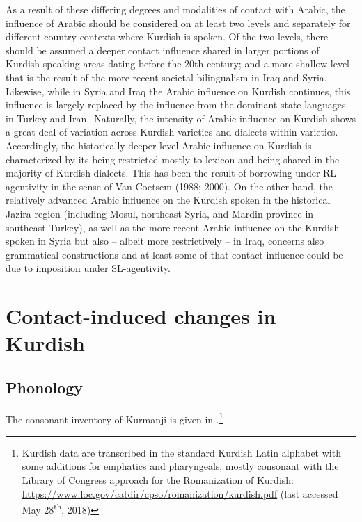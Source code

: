 \documentclass[output=paper]{langsci/langscibook}
\begin{document}
As a result of these differing degrees and modalities of contact with Arabic, the influence of Arabic should be considered on at least two levels and separately for different country contexts where Kurdish is spoken. Of the two levels, there should be assumed a deeper contact influence shared in larger portions of Kurdish-speaking areas dating before the 20th century; and a more shallow level that is the result of the more recent societal bilingualism in Iraq and Syria. Likewise, while in Syria and Iraq the Arabic influence on Kurdish continues, this influence is largely replaced by the influence from the dominant state languages in Turkey and Iran.~Naturally, the intensity of Arabic influence on Kurdish shows a great deal of variation across Kurdish varieties and dialects within varieties. Accordingly, the historically-deeper level Arabic influence on Kurdish is characterized by its being restricted mostly to lexicon and being shared in the majority of Kurdish dialects. This has been the result of borrowing under RL-agentivity in the sense of Van Coetsem (1988; 2000). On the other hand, the relatively advanced Arabic influence on the Kurdish spoken in the historical Jazira region (including Mosul, northeast Syria, and Mardin province in southeast Turkey), as well as the more recent Arabic influence on the Kurdish spoken in Syria but also – albeit more restrictively – in Iraq, concerns also grammatical constructions and at least some of that contact influence could be due to imposition under SL-agentivity.    

\section{Contact-induced changes in Kurdish} 

\subsection{\label{bkm:Ref14688184}Phonology}

The consonant inventory of Kurmanji is given in .\footnote{Kurdish data are transcribed in the standard Kurdish Latin alphabet with some additions for emphatics and pharyngeals, mostly consonant with the Library of Congress approach for the Romanization of Kurdish: \url{https://www.loc.gov/catdir/cpso/romanization/kurdish.pdf} (last accessed May 28\textsuperscript{th}, 2018)} 
\end{document}
